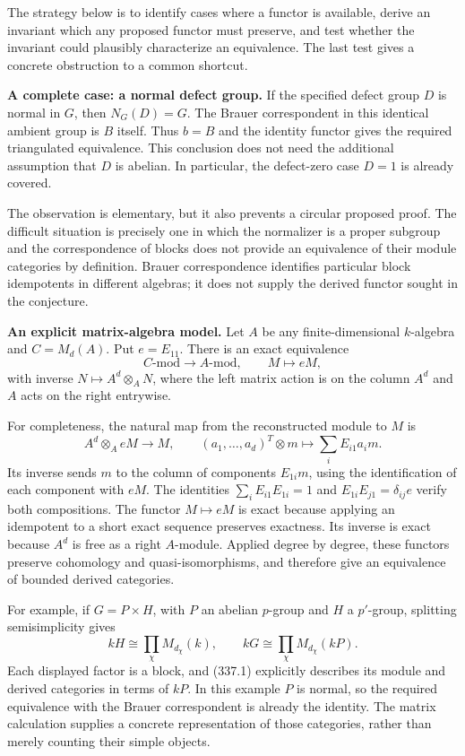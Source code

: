 \documentclass[11pt]{article}
\begin{document}
The strategy below is to identify cases where a functor is available, derive an invariant which any proposed functor must preserve, and test whether the invariant could plausibly characterize an equivalence. The last test gives a concrete obstruction to a common shortcut.

\textbf{A complete case: a normal defect group.} If the specified defect group $D$ is normal in $G$, then $N_G(D)=G$. The Brauer correspondent in this identical ambient group is $B$ itself. Thus $b=B$ and the identity functor gives the required triangulated equivalence. This conclusion does not need the additional assumption that $D$ is abelian. In particular, the defect-zero case $D=1$ is already covered.

The observation is elementary, but it also prevents a circular proposed proof. The difficult situation is precisely one in which the normalizer is a proper subgroup and the correspondence of blocks does not provide an equivalence of their module categories by definition. Brauer correspondence identifies particular block idempotents in different algebras; it does not supply the derived functor sought in the conjecture.

\textbf{An explicit matrix-algebra model.} Let $A$ be any finite-dimensional $k$-algebra and $C=M_d(A)$. Put $e=E_{11}$. There is an exact equivalence
\[
 C\text{-}\mathrm{mod}\longrightarrow A\text{-}\mathrm{mod},
 \qquad M\longmapsto eM,
 \tag{337.1}
\]
with inverse $N\mapsto A^d\otimes_A N$, where the left matrix action is on the column $A^d$ and $A$ acts on the right entrywise.

For completeness, the natural map from the reconstructed module to $M$ is
\[
 A^d\otimes_A eM\longrightarrow M,
 \qquad (a_1,\ldots,a_d)^T\otimes m
       \longmapsto\sum_i E_{i1}a_i m.
\]
Its inverse sends $m$ to the column of components $E_{1i}m$, using the identification of each component with $eM$. The identities $\sum_iE_{i1}E_{1i}=1$ and $E_{1i}E_{j1}=\delta_{ij}e$ verify both compositions. The functor $M\mapsto eM$ is exact because applying an idempotent to a short exact sequence preserves exactness. Its inverse is exact because $A^d$ is free as a right $A$-module. Applied degree by degree, these functors preserve cohomology and quasi-isomorphisms, and therefore give an equivalence of bounded derived categories.

For example, if $G=P\times H$, with $P$ an abelian $p$-group and $H$ a $p'$-group, splitting semisimplicity gives
\[
 kH\cong\prod_{\chi}M_{d_\chi}(k),
 \qquad kG\cong\prod_{\chi}M_{d_\chi}(kP).
\]
Each displayed factor is a block, and (337.1) explicitly describes its module and derived categories in terms of $kP$. In this example $P$ is normal, so the required equivalence with the Brauer correspondent is already the identity. The matrix calculation supplies a concrete representation of those categories, rather than merely counting their simple objects.
\end{document}
